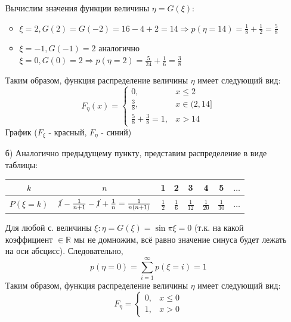\begin{enumerate}
	Вычислим значения функции величины $\eta = G(\xi)$:
	\begin{itemize}
		\item $\xi = 2, G(2) = G(-2) = 16 - 4 + 2 = 14 \Rightarrow p(\eta = 14) = \frac{1}{8} + \frac{1}{2} = \frac{5}{8}$
		\item $\xi = -1, G(-1) = 2$ аналогично $\xi = 0, G(0) = 2 \Rightarrow p(\eta = 2) = \frac{5}{24} + \frac{1}{6} = \frac{3}{8}$
	\end{itemize}
	Таким образом, функция распределение величины $\eta$ имеет следующий вид:
	\[
	F_{\eta}(x) =
	\begin{cases}
		0, &x \le 2 \\
		\frac{3}{8}, &x \in (2, 14] \\
		\frac{5}{8} + \frac{3}{8} = 1, &x > 14
	\end{cases}
	\]
	График ($F_{\xi}$ - красный, $F_{\eta}$ - синий)
	\begin{figure}[H]
	\end{figure}
	\item[б)] Аналогично предыдущему пункту, представим распределение в виде таблицы:
	\begin{table}[H]
		\centering\makegapedcells
		\begin{tabular}{|c|c|c|c|c|c|c|c|}
			\hline
			$k$        & $n$                                              & 1             & 2             & 3              & 4              & 5              & $\dots$ \\ \hline
			$P(\xi=k)$ & $\cancel{1}-\frac{1}{n+1}-\cancel{1}+\frac{1}{n}=\frac{1}{n(n+1)}$ & $\frac{1}{2}$ & $\frac{1}{6}$ & $\frac{1}{12}$ & $\frac{1}{20}$ & $\frac{1}{30}$ & $\dots$ \\ \hline
		\end{tabular}
	\end{table}
	Для любой с. величины $\xi: \eta = G(\xi) = \sin \pi \xi = 0$ (т.к. на какой коэффициент $\in \mathbb{R}$ мы не домножим, всё равно значение синуса будет лежать на оси абсцисс). Следовательно,
	\[ p(\eta = 0) = \sum_{i=1}^{\infty} p(\xi = i) = 1 \]
	Таким образом, функция распределение величины $\eta$ имеет следующий вид:
	\[
	F_{\eta} =
	\begin{cases}
		0, &x \le 0 \\
		1, &x > 0
	\end{cases}
	\]

\end{enumerate}

